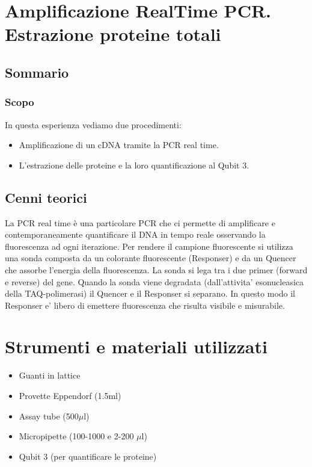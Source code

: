 \section{\LARGE{Amplificazione RealTime PCR. Estrazione proteine totali}}

\vspace{0.6cm}

\subsection{Sommario}

\subsubsection{Scopo}

In questa esperienza vediamo due procedimenti:
\begin{itemize}
  \item Amplificazione di un cDNA tramite la PCR real time.
  \item L'estrazione delle proteine e la loro quantificazione al Qubit 3.
\end{itemize}

\subsection{Cenni teorici}

La PCR real time è una particolare PCR che ci permette di amplificare e
contemporaneamente quantificare il DNA in tempo reale osservando la fluorescenza
ad ogni iterazione.
Per rendere il campione fluorescente si utilizza una sonda composta da un colorante
fluorescente (Responser) e da un Quencer che assorbe l'energia della fluorescenza.
La sonda si lega tra i due primer (forward e reverse) del gene.
Quando la sonda viene degradata (dall'attivita' esonucleasica della TAQ-polimerasi)
il Quencer e il Responser si separano. In questo modo il Responser e' libero di emettere
fluorescenza che risulta visibile e misurabile.

\section{Strumenti e materiali utilizzati}

\begin{itemize}
\item Guanti in lattice
\item Provette Eppendorf (1.5ml)
\item Assay tube (500$\mu$l)
\item Micropipette (100-1000  e 2-200 $\mu$l)
\item Qubit 3 (per quantificare le proteine)
\end{itemize}

